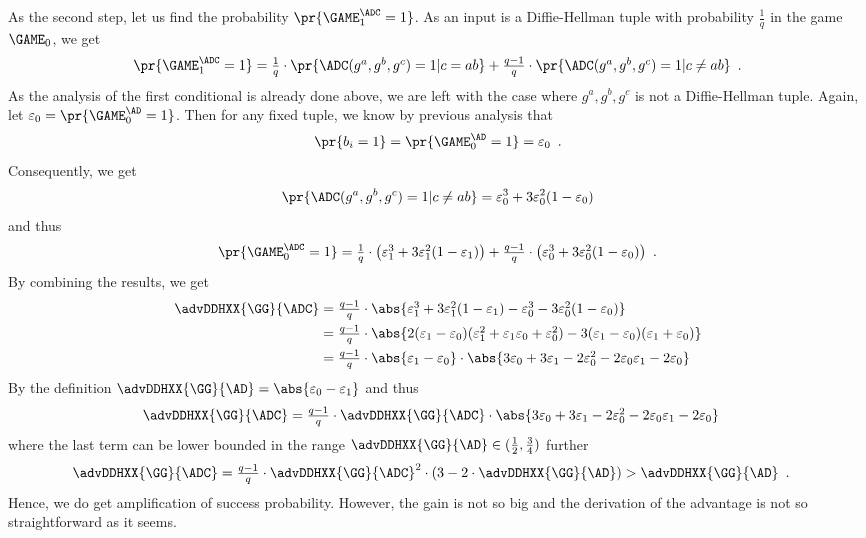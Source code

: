 \documentclass{crypto-exercise}
\begin{document}
{\begin{solution}
As the second step, let us find the probability
$\pr{\GAME_1^\ADC=1}$. As an input is a Diffie-Hellman tuple with
probability $\frac{1}{q}$ in the game $\GAME_0$, we get
\begin{align*}
  \pr{\GAME_1^\ADC=1}=\textstyle\frac{1}{q}\cdot  \pr{\ADC(g^a,g^b,g^c)=1|c=ab}
   +\frac{q-1}{q}\cdot  \pr{\ADC(g^a,g^b,g^c)=1|c\neq ab}\enspace. 
\end{align*}
As the analysis of the first conditional is already done above, we are
left with the case where $g^a,g^b,g^c$ is not a Diffie-Hellman
tuple. Again, let $\varepsilon_0=\pr{\GAME_0^\AD=1}$. Then for any
fixed tuple, we know by previous analysis that
\begin{align*}
  \pr{b_i=1}=\pr{\GAME_0^\AD=1}=\varepsilon_0\enspace.
\end{align*}
Consequently, we get
\begin{align*}
  \pr{\ADC(g^a,g^b,g^c)=1|c\neq ab}=\varepsilon_0^3 +3\varepsilon_0^2(1-\varepsilon_0)
\end{align*}
and thus
\begin{align*}
  \pr{\GAME_0^\ADC=1}=\textstyle\frac{1}{q}\cdot\bigl(\varepsilon_1^3 +3\varepsilon_1^2(1-\varepsilon_1)\bigr)
  +\frac{q-1}{q}\cdot \bigl(\varepsilon_0^3 +3\varepsilon_0^2(1-\varepsilon_0)\bigr)\enspace.
\end{align*}
By combining the results, we get
\begin{align*}
  \advDDHXX{\GG}{\ADC}&=\textstyle\frac{q-1}{q}\cdot
  \abs{\varepsilon_1^3 +3\varepsilon_1^2(1-\varepsilon_1)-\varepsilon_0^3 -3\varepsilon_0^2(1-\varepsilon_0)}\\
  &=\textstyle\frac{q-1}{q}\cdot 
  \abs{2(\varepsilon_1 - \varepsilon_0)(\varepsilon_1^2 + \varepsilon_1\varepsilon_0 + \varepsilon_0^2)
 - 3(\varepsilon_1 - \varepsilon_0)(\varepsilon_1 + \varepsilon_0)}\\
  &=\textstyle\frac{q-1}{q}\cdot\abs{\varepsilon_1 - \varepsilon_0} \cdot
  \abs{\smash{3\varepsilon_0 +3\varepsilon_1 - 2\varepsilon_0^2  - 2\varepsilon_0\varepsilon_1 - 2\varepsilon_0}}
\end{align*}
By the definition $\advDDHXX{\GG}{\AD}=\abs{\varepsilon_0-\varepsilon_1}$ and thus
\begin{align*}
   \advDDHXX{\GG}{\ADC}&=\textstyle\frac{q-1}{q}\cdot \advDDHXX{\GG}{\ADC}\cdot
  \abs{\smash{3\varepsilon_0 +3\varepsilon_1 - 2\varepsilon_0^2  - 2\varepsilon_0\varepsilon_1 - 2\varepsilon_0}}
\end{align*}
where the last term can be lower bounded in the range
$\advDDHXX{\GG}{\AD}\in(\frac{1}{2},\frac{3}{4})$ further
\begin{align*}
   \advDDHXX{\GG}{\ADC}&=\textstyle\frac{q-1}{q}\cdot \advDDHXX{\GG}{\ADC}^2
 \cdot (3 - 2\cdot\advDDHXX{\GG}{\AD} ) >\advDDHXX{\GG}{\AD}\enspace.
\end{align*}
Hence, we do get amplification of success probability. However, the
gain is not so big and the derivation of the advantage is not so
straightforward as it seems. 


\end{solution}}
\end{document}
